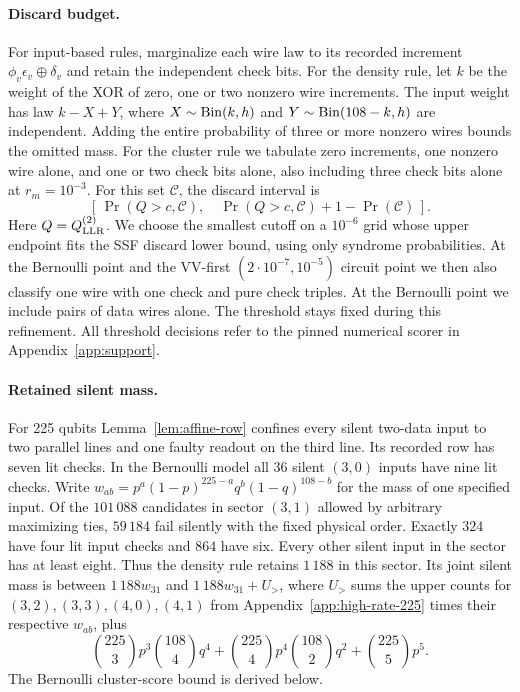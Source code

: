 \documentclass[10pt,twocolumn]{article}
\theoremstyle{definition}
\begin{document}
\paragraph{Discard budget.}
For input-based rules, marginalize each wire law to its recorded
increment $\phi_v\epsilon_v\oplus\delta_v$ and retain the independent
check bits. For the density rule, let $k$ be the weight of the XOR
of zero, one or two nonzero wire increments. The input weight has
law $k-X+Y$, where $X\sim{\rm Bin}(k,h)$ and
$Y\sim{\rm Bin}(108-k,h)$ are independent. Adding the entire
probability of three or more nonzero wires bounds the omitted mass.
For the cluster rule we tabulate zero increments, one nonzero wire
alone, and one or two check bits alone, also including three check
bits alone at $r_m=10^{-3}$. For this set $\mathcal C$, the discard
interval is
\[
 [\,\Pr(Q>c,\mathcal C),\quad
    \Pr(Q>c,\mathcal C)+1-\Pr(\mathcal C)\,].
\]
Here $Q=Q_{\rm LLR}^{(2)}$. We choose the smallest cutoff on a
$10^{-6}$ grid whose upper endpoint fits the SSF discard lower
bound, using only syndrome probabilities. At the Bernoulli point
and the VV-first $(2\cdot10^{-7},10^{-5})$ circuit point we then
also classify one wire with one check and pure check triples. At
the Bernoulli point we include pairs of data wires alone. The
threshold stays fixed during this refinement. All threshold
decisions refer to the pinned numerical scorer in Appendix~\ref{app:support}.

\paragraph{Retained silent mass.}
For 225 qubits Lemma~\ref{lem:affine-row} confines every silent
two-data input to two parallel lines and one faulty readout on
the third line. Its recorded row has seven lit checks. In the
Bernoulli model all $36$ silent $(3,0)$ inputs have nine lit checks.
Write $w_{ab}=p^a(1-p)^{225-a}q^b(1-q)^{108-b}$ for the mass of
one specified input. Of the $101\,088$ candidates in sector $(3,1)$
allowed by arbitrary maximizing ties, $59\,184$ fail silently with
the fixed physical order. Exactly $324$ have four lit input checks
and $864$ have six. Every other silent input in the sector has at
least eight. Thus the density rule retains $1\,188$ in this sector.
Its joint silent mass is between $1\,188w_{31}$ and
$1\,188w_{31}+U_>$, where $U_>$ sums the upper counts for
$(3,2),(3,3),(4,0),(4,1)$ from Appendix~\ref{app:high-rate-225}
times their respective $w_{ab}$, plus
\[
 \binom{225}3p^3\binom{108}4q^4+
 \binom{225}4p^4\binom{108}2q^2+\binom{225}5p^5 .
\]
The Bernoulli cluster-score bound is derived below.
\end{document}
